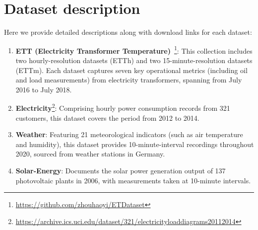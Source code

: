 \documentclass{article}
\begin{document}
\newpage
\section{Dataset description}
\label{sec:datasetdes}
Here we provide detailed descriptions along with download links for each dataset:
\begin{enumerate}
    \item \textbf{ETT (Electricity Transformer Temperature)}~\cite{informer}\footnote{\url{https://github.com/zhouhaoyi/ETDataset}}:
    This collection includes two hourly-resolution datasets (ETTh) and two 15-minute-resolution datasets (ETTm). Each dataset captures seven key operational metrics (including oil and load measurements) from electricity transformers, spanning from July 2016 to July 2018.
    
    \item \textbf{Electricity}\footnote{\url{https://archive.ics.uci.edu/dataset/321/electricityloaddiagrams20112014}}:
    Comprising hourly power consumption records from 321 customers, this dataset covers the period from 2012 to 2014.
    
    \item \textbf{Weather}:
    Featuring 21 meteorological indicators (such as air temperature and humidity), this dataset provides 10-minute-interval recordings throughout 2020, sourced from weather stations in Germany.
    
    \item \textbf{Solar-Energy}:
    Documents the solar power generation output of 137 photovoltaic plants in 2006, with measurements taken at 10-minute intervals.
\end{enumerate}

\begin{table}[htbp]
    \centering
    \caption{Detailed Dataset Descriptions. The table summarizes key characteristics of the time series datasets, including the number of channels, prediction lengths, dataset splits, temporal granularity, and application domains.}
\end{table}
\end{document}
